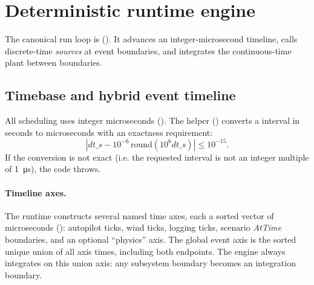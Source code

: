 \section{Deterministic runtime engine}
\label{sec:runtime}

The canonical run loop is  (). It advances an integer-microsecond timeline, calls discrete-time \emph{sources} at event boundaries, and integrates the continuous-time plant between boundaries.

\subsection{Timebase and hybrid event timeline}
\label{sec:runtime-timebase}

All scheduling uses integer microseconds (). The helper  () converts a  interval in seconds to microseconds with an exactness requirement:
\begin{equation}
  \left|dt\_s - 10^{-6}\,\mathrm{round}(10^{6} dt\_s)\right| \le 10^{-15}.
\end{equation}
If the conversion is not exact (i.e. the requested interval is not an integer multiple of \SI{1}{\micro\second}), the code throws.

\paragraph{Timeline axes.}
The runtime constructs several named time axes, each a sorted vector of microseconds (): autopilot ticks, wind ticks, logging ticks, scenario \emph{AtTime} boundaries, and an optional ``physics'' axis. The global event axis is the sorted unique union of all axis times, including both endpoints. The engine always integrates on this union axis: any subsystem boundary becomes an integration boundary.

